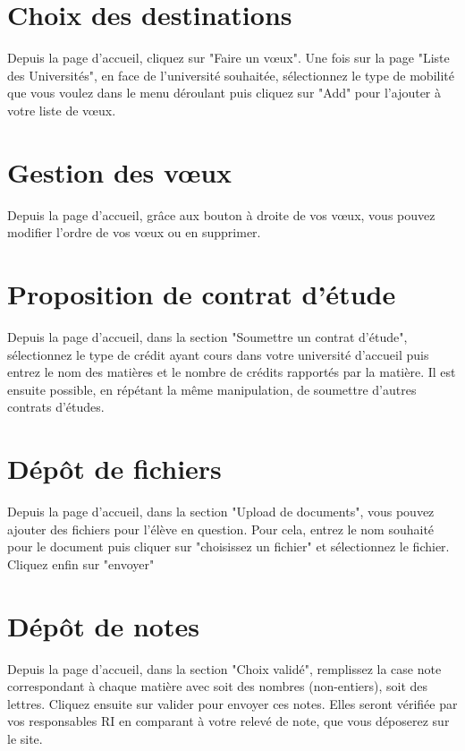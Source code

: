 \section{Choix des destinations}

Depuis la page d'accueil, cliquez sur "Faire un vœux". Une fois sur la page "Liste des Universités", en face de l'université souhaitée, sélectionnez le type de mobilité que vous voulez dans le menu déroulant puis cliquez sur "Add" pour l'ajouter à votre liste de vœux.   
 
\section{Gestion des vœux}

Depuis la page d'accueil, grâce aux bouton à droite de vos vœux, vous pouvez modifier l'ordre de vos vœux ou en supprimer.

\section{Proposition de contrat d'étude}
\label{propce}
Depuis la page d'accueil, dans la section "Soumettre un contrat d'étude", sélectionnez le type de crédit ayant cours dans votre université d'accueil puis entrez le nom des matières et le nombre de crédits rapportés par la matière.
Il est ensuite possible, en répétant la même manipulation, de soumettre d'autres contrats d'études.

\section{Dépôt de fichiers}
\label{depfich}
Depuis la page d'accueil, dans la section "Upload de documents", vous pouvez ajouter des fichiers pour l'élève en question. Pour cela, entrez le nom souhaité pour le document puis cliquer sur "choisissez un fichier" et sélectionnez le fichier. Cliquez enfin sur "envoyer" 

\section{Dépôt de notes}
\label{depnot}
Depuis la page d'accueil, dans la section "Choix validé", remplissez la case note correspondant à chaque matière avec soit des nombres (non-entiers), soit des lettres. Cliquez ensuite sur valider pour envoyer ces notes. Elles seront vérifiée par vos responsables RI en comparant à votre relevé de note, que vous déposerez sur le site.
